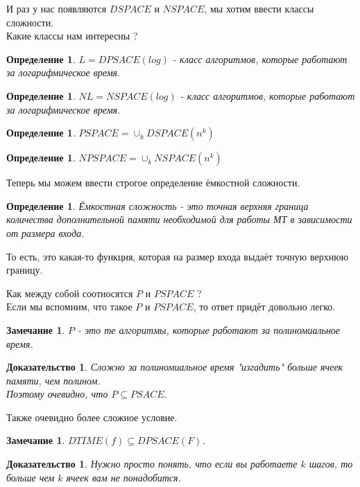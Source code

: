 \documentclass{beamer}
\theoremstyle{plain}
\newtheorem{rmk}[thm]{Замечание}
\newtheorem{proof-rus}[thm]{Доказательство}
\newtheorem{dfn}[thm]{Определение}
\theoremstyle{definition}
\begin{document}
\begin{frame}
    И раз у нас появляются $DSPACE$ и $NSPACE$, мы хотим ввести классы сложности. \\
    Какие классы нам интересны ?
    \begin{dfn}
        $L = DPSACE(log)$ - класс алгоритмов, которые работают за логарифмическое
        время.
    \end{dfn}
    \begin{dfn}
        $NL = NSPACE(log)$ - класс алгоритмов, которые работают за логарифмическое
        время.
    \end{dfn}
    \begin{dfn}
        $PSPACE = \cup_k DSPACE(n^k)$
    \end{dfn}
    \begin{dfn}
        $NPSPACE = \cup_k NSPACE(n^k)$
    \end{dfn}
\end{frame}

\begin{frame}
    Теперь мы можем ввести строгое определение ёмкостной сложности.
    \begin{dfn}
        Ёмкостная сложность - это точная верхняя граница количества дополнительной
        памяти необходимой для работы МТ в зависимости от размера входа.
    \end{dfn}
    То есть, это какая-то функция, которая на размер входа выдаёт точную верхнюю границу.
\end{frame}

\begin{frame}
    Как между собой соотносятся $P$ и $PSPACE$ ? \\
    Если мы вспомним, что такое $P$ и $PSPACE$, то ответ придёт довольно легко.
    \begin{rmk}
        $P$ - это те алгоритмы, которые работают за полиномиальное время. \\
    \end{rmk}
    \begin{proof-rus}
        Сложно за полиномиальное время "изгадить" больше ячеек памяти, чем полином. \\
        Поэтому очевидно, что $P \subseteq PSACE$.
    \end{proof-rus}
\end{frame}

\begin{frame}
    Также очевидно более сложное условие.
    \begin{rmk}
        $DTIME(f) \subseteq DPSACE(F)$.
    \end{rmk}
    \begin{proof-rus}
        Нужно просто понять, что если вы работаете $k$ шагов, то больше чем $k$ ячеек
        вам не понадобится. \\
    \end{proof-rus}
\end{frame}
\end{document}
